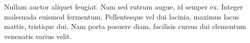 \documentclass[twoside,letterpaper]{article}
\begin{document}
\thispagestyle{empty}

Nullam auctor aliquet feugiat. Nam sed rutrum augue, id semper
ex. Integer malesuada euismod fermentum. Pellentesque vel dui lacinia,
maximus lacus mattis, tristique dui. Nam porta posuere diam, facilisis
cursus dui elementum venenatis varius velit.
\end{document}
